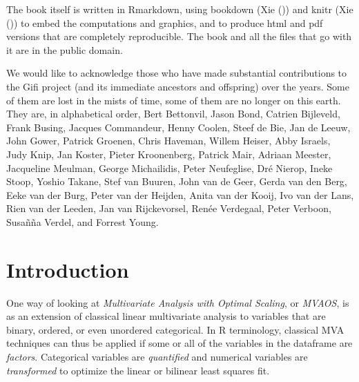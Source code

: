 \documentclass[
  12pt,
  letterpaper,
]{scrbook}
\begin{document}
The book itself is written in Rmarkdown, using bookdown (Xie
()) and knitr (Xie
()) to embed the computations and graphics,
and to produce html and pdf versions that are completely reproducible.
The book and all the files that go with it are in the public domain.

We would like to acknowledge those who have made substantial
contributions to the Gifi project (and its immediate ancestors and
offspring) over the years. Some of them are lost in the mists of time,
some of them are no longer on this earth. They are, in alphabetical
order, Bert Bettonvil, Jason Bond, Catrien Bijleveld, Frank Busing,
Jacques Commandeur, Henny Coolen, Steef de Bie, Jan de Leeuw, John
Gower, Patrick Groenen, Chris Haveman, Willem Heiser, Abby Israels, Judy
Knip, Jan Koster, Pieter Kroonenberg, Patrick Mair, Adriaan Meester,
Jacqueline Meulman, George Michailidis, Peter Neufeglise, Dré Nierop,
Ineke Stoop, Yoshio Takane, Stef van Buuren, John van de Geer, Gerda van
den Berg, Eeke van der Burg, Peter van der Heijden, Anita van der Kooij,
Ivo van der Lans, Rien van der Leeden, Jan van Rijckevorsel, Renée
Verdegaal, Peter Verboon, Susañña Verdel, and Forrest Young.


\chapter{Introduction}\label{introduction}

One way of looking at \emph{Multivariate Analysis with Optimal Scaling},
or \emph{MVAOS}, is as an extension of classical linear multivariate
analysis to variables that are binary, ordered, or even unordered
categorical. In R terminology, classical MVA techniques can thus be
applied if some or all of the variables in the dataframe are
\emph{factors}. Categorical variables are \emph{quantified} and
numerical variables are \emph{transformed} to optimize the linear or
bilinear least squares fit.
\end{document}
